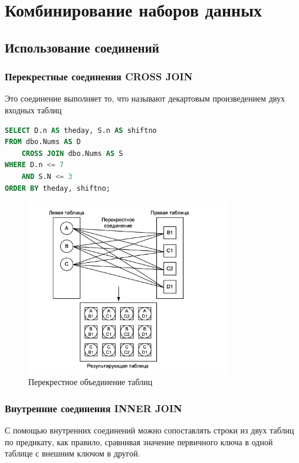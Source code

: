 \chapter{Комбинирование наборов данных}
\section{Использование соединений}

\subsection{Перекрестные соединения CROSS JOIN}
Это соединение выполняет то, что называют
декартовым произведением двух входных таблиц


\begin{lstlisting}[label=lst:funcReturn, caption=Пример CROSS JOIN, language=sql]
SELECT D.n AS theday, S.n AS shiftno
FROM dbo.Nums AS D
	CROSS JOIN dbo.Nums AS S
WHERE D.n <= 7
	AND S.N <= 3
ORDER BY theday, shiftno;
\end{lstlisting}

\begin{figure}[h!]
	\begin{center}
		\includegraphics[width=0.8\textwidth]{img/cross.png}
	\end{center}
	\caption{Перекрестное объединение таблиц}
	\captionsetup{justification=centering}
\end{figure}


\subsection{Внутренние соединения INNER JOIN}
С помощью внутренних соединений можно сопоставлять строки из двух таблиц по предикату, как правило, сравнивая значение первичного ключа в одной таблице с внешним ключом в другой. 

